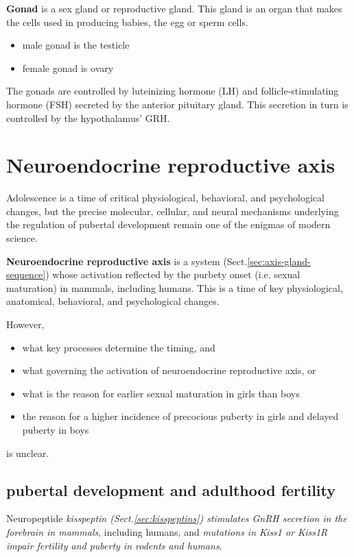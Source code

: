 {\bf Gonad} is a sex gland or reproductive gland.
This gland is an organ that makes the cells used in producing babies, the egg or
sperm cells.
\begin{itemize}
  \item male gonad is the testicle
  
  \item female gonad is ovary
\end{itemize}

The gonads are controlled by luteinizing hormone (LH) and follicle-stimulating
hormone (FSH) secreted by the anterior pituitary gland.
This secretion in turn is controlled by the hypothalamus' GRH.

 
 \section{Neuroendocrine reproductive axis}
\label{sec:neuroendocrine-reproductive-axis}


Adolescence is a time of critical physiological, behavioral, and psychological
changes, but the precise molecular, cellular, and neural mechanisms underlying
the regulation of pubertal development remain one of the enigmas of modern
science.


{\bf Neuroendocrine reproductive axis} is a system
(Sect.\ref{sec:axis-gland-sequence}) whose activation reflected by the purbety
onset (i.e. sexual maturation) in mammals, including humans.
This is a time of key physiological, anatomical, behavioral, and psychological
changes.

However, 
\begin{itemize}
  \item  what key processes determine the timing, and 
  \item what governing the activation of neuroendocrine reproductive axis, or
  \item what is the reason for earlier sexual maturation in girls than boys
  \item the reason for a higher incidence of precocious puberty in girls and
  delayed puberty in boys
\end{itemize}
is unclear. 

\subsection{pubertal development and adulthood fertility}
\label{sec:pubertal-development}

Neuropeptide {\it kisspeptin (Sect.\ref{sec:kisspeptins}) stimulates GnRH
secretion in the forebrain in mammals}, including humans, and {\it mutations in
Kiss1 or Kiss1R impair fertility and puberty in rodents and humans}.

